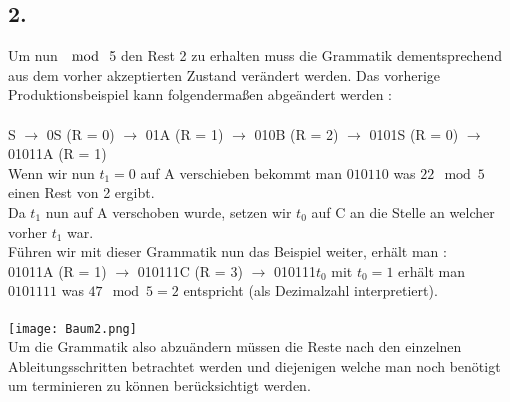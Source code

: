 \documentclass[11pt]{article}
\theoremstyle{definition}
\theoremstyle{remark}
\begin{document}
    \subsection*{2.}
    \begin{normalsize}
        Um nun $\mod$ 5 den Rest 2 zu erhalten muss die Grammatik dementsprechend aus dem vorher akzeptierten Zustand verändert werden.
        Das vorherige Produktionsbeispiel kann folgendermaßen abgeändert werden : \\
        \\
        S $\rightarrow$ 0S (R = 0) $\rightarrow$ 01A (R = 1) $\rightarrow$ 010B (R = 2) $\rightarrow$ 0101S (R = 0) $\rightarrow$ 01011A (R = 1) \\
        Wenn wir nun $t_1 = 0$ auf A verschieben bekommt man $010110$ was $22\mod5$ einen Rest von 2 ergibt. \\
        Da $t_1$ nun auf A verschoben wurde, setzen wir $t_0$ auf C an die Stelle an welcher vorher $t_1$ war.  \\
        Führen wir mit dieser Grammatik nun das Beispiel weiter, erhält man : \\
        01011A (R = 1) $\rightarrow$ 010111C (R = 3) $\rightarrow$ 010111$t_0$ mit $t_0 = 1$ erhält man $0101111$ was $47\mod5 = 2$ entspricht (als Dezimalzahl interpretiert). \\
        \\
        \texttt{[image: Baum2.png]}
        \\
        Um die Grammatik also abzuändern müssen die Reste nach den einzelnen Ableitungsschritten betrachtet werden und diejenigen welche man noch benötigt um terminieren zu können berücksichtigt werden. \\

    \end{normalsize}
\end{document}
